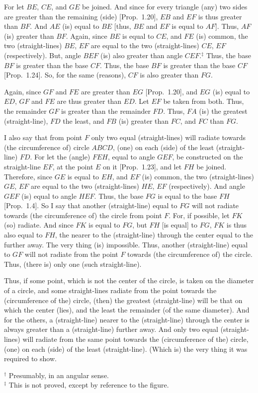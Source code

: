\begin{Parallel}{}{}
{For let $BE$, $CE$, and $GE$ be joined. And since for every triangle
(any) two sides are greater than the remaining (side) [Prop.~1.20],
$EB$ and $EF$ is thus greater than $BF$. And $AE$ (is) equal to $BE$ [thus,
$BE$ and $EF$ is equal to $AF$]. Thus, $AF$ (is) greater than $BF$. Again,
since $BE$ is equal to $CE$, and $FE$ (is) common, the two (straight-lines)
$BE$, $EF$ are equal to the two (straight-lines) $CE$, $EF$ (respectively). But, angle $BEF$ (is)
also greater than angle $CEF$.$^\ddag$ Thus, the base $BF$ is greater than the base $CF$.
Thus, the base $BF$ is greater than the base $CF$ [Prop.~1.24]. So, for the same (reasons), $CF$ is also greater than $FG$.

Again, since $GF$ and $FE$ are greater than $EG$ [Prop.~1.20], and $EG$
(is) equal to $ED$, $GF$ and $FE$ are thus greater than $ED$. Let $EF$ be
taken from both. Thus, the remainder $GF$ is greater than the remainder $FD$.
Thus, $FA$ (is) the greatest  (straight-line), $FD$ the least, and $FB$ (is) greater than $FC$, and $FC$ than $FG$.

\epsfysize=2.5in
\centerline{}

I also say that from point $F$ only two equal (straight-lines) will radiate
towards (the circumference of) circle $ABCD$, (one) on each (side) of the
least (straight-line) $FD$. For let the (angle) $FEH$, equal to angle $GEF$, be constructed on the straight-line $EF$, at the point $E$ on it [Prop.~1.23], and
let $FH$ be joined. Therefore, since $GE$ is equal to $EH$, and $EF$ (is) common, the two (straight-lines) $GE$, $EF$ are equal to the two (straight-lines)
$HE$, $EF$ (respectively). And angle $GEF$ (is) equal to angle $HEF$. Thus, the base $FG$ is
equal to the base $FH$ [Prop.~1.4]. So I say that another (straight-line)
equal to $FG$
will not radiate towards (the circumference of)
the circle from point $F$. For, if possible, let $FK$ (so) radiate. And since
$FK$ is equal to $FG$, but $FH$ [is equal] to $FG$, $FK$ is thus also equal to
$FH$, the nearer to the (straight-line) through the center equal to the
further away. The very thing (is) impossible. Thus, another (straight-line)
equal to $GF$ will not radiate from the point $F$ towards (the circumference of) the circle.
Thus, (there is) only one (such straight-line).

Thus, if some point, which is not the
center of the circle, is taken on the diameter of a circle,
and some straight-lines radiate from the point towards
the (circumference of the) circle, (then) the greatest (straight-line) will be that on which
the center (lies), and the least the remainder (of the same diameter). And
for the others, a (straight-line) nearer to the (straight-line) through the center is always
greater than a (straight-line) further away. And only two equal (straight-lines)
will radiate from the same point towards the (circumference of the) circle,  (one)
on each (side) of the least (straight-line). (Which is) the very thing it was required to show.}
\end{Parallel}
{\footnotesize \noindent$^\dag$ Presumably, in an angular sense.\\
$^\ddag$ This is not proved, except by reference to the figure.}

